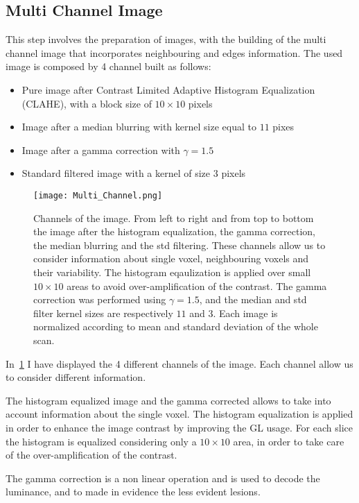 \documentclass{standalone}
\begin{document}
	\subsection*{Multi Channel Image}
	
		This step involves the preparation of images, with the building of the multi channel image that incorporates neighbouring and edges information. 
		The used image is composed by 4 channel built as follows:  
		\begin{itemize}
			\item Pure image after Contrast Limited Adaptive Histogram Equalization (CLAHE), with a block size of  $10\times 10$ pixels
			\item Image after a median blurring with kernel size equal to $11$ pixes
			\item Image after a gamma correction with $\gamma = 1.5$
			\item Standard filtered image with a kernel of size $3$ pixels
		\end{itemize}
	
		\begin{figure}[h]
			\centering
				\texttt{[image: Multi\_Channel.png]}
			\caption{Channels of the image. From left to right and from top to bottom the image after the histogram equalization, the gamma correction, the median blurring and the std filtering. These channels allow us to consider information about single voxel, neighbouring voxels and their variability. The histogram eqaulization is applied over small $10\times 10$ areas to avoid  over-amplification of the contrast. The gamma correction was performed using $\gamma = 1.5$, and the median and std filter kernel sizes are respectively $11$ and $3$. Each image is normalized according to mean and standard deviation of the whole scan. }\label{fig:MultiChannel}
		\end{figure}
	
		In \figurename\,\ref{fig:MultiChannel} I have displayed the 4 different channels of the image. Each channel allow us to consider different information.
		
		The histogram equalized image and the gamma corrected allows to take into account information about the single voxel. The histogram equalization is applied in order to enhance the image contrast by improving the GL usage. For each slice the histogram is equalized considering only a $10\times 10$ area, in order to take care of the over-amplification of the contrast.
		
		The gamma correction is a non linear operation and is used to decode the luminance, and to made in evidence the less evident lesions. 
		
\end{document}
